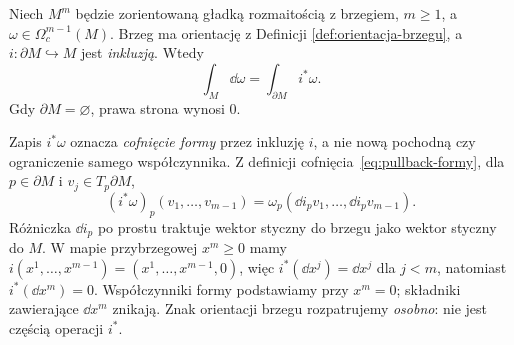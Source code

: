 \begin{twierdzenie}
\label{thm:stokes-formy}
Niech $M^m$ będzie zorientowaną gładką rozmaitością
z brzegiem, $m\geq1$, a $\omega\in\Omega_c^{m-1}(M)$.
Brzeg ma orientację z Definicji
\ref{def:orientacja-brzegu}, a
$i:\partial M\hookrightarrow M$ jest \emph{inkluzją}.
Wtedy
\begin{equation}\label{eq:stokes-formy}
 {\displaystyle \int_M\dd\omega
        =\int_{\partial M}i^*\omega.}
\end{equation}
Gdy $\partial M=\varnothing$, prawa strona wynosi $0$.
\end{twierdzenie}

Zapis $i^*\omega$ oznacza \emph{cofnięcie formy}
przez inkluzję $i$, a nie nową pochodną czy
ograniczenie samego współczynnika. Z definicji
cofnięcia~\eqref{eq:pullback-formy}, dla
$p\in\partial M$ i $v_j\in T_p\partial M$,
\begin{equation}\label{eq:inkluzja-formy}
 (i^*\omega)_p(v_1,\ldots,v_{m-1})
 =\omega_p(\dd i_pv_1,\ldots,\dd i_pv_{m-1}).
\end{equation}
Różniczka $\dd i_p$ po prostu traktuje wektor
styczny do brzegu jako wektor styczny do $M$.
W mapie przybrzegowej $x^m\geq0$ mamy
$i(x^1,\ldots,x^{m-1})=(x^1,\ldots,x^{m-1},0)$,
więc $i^*(\dd x^j)=\dd x^j$ dla $j<m$, natomiast
$i^*(\dd x^m)=0$. Współczynniki formy podstawiamy
przy $x^m=0$; składniki zawierające $\dd x^m$
znikają. Znak orientacji brzegu rozpatrujemy
\emph{osobno}: nie jest częścią operacji $i^*$.

